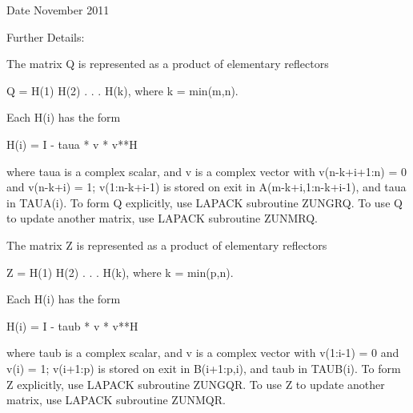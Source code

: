 \begin{DoxyDate}{Date}
November 2011 
\end{DoxyDate}
\begin{DoxyParagraph}{Further Details\+: }
\begin{DoxyVerb}  The matrix Q is represented as a product of elementary reflectors

     Q = H(1) H(2) . . . H(k), where k = min(m,n).

  Each H(i) has the form

     H(i) = I - taua * v * v**H

  where taua is a complex scalar, and v is a complex vector with
  v(n-k+i+1:n) = 0 and v(n-k+i) = 1; v(1:n-k+i-1) is stored on exit in
  A(m-k+i,1:n-k+i-1), and taua in TAUA(i).
  To form Q explicitly, use LAPACK subroutine ZUNGRQ.
  To use Q to update another matrix, use LAPACK subroutine ZUNMRQ.

  The matrix Z is represented as a product of elementary reflectors

     Z = H(1) H(2) . . . H(k), where k = min(p,n).

  Each H(i) has the form

     H(i) = I - taub * v * v**H

  where taub is a complex scalar, and v is a complex vector with
  v(1:i-1) = 0 and v(i) = 1; v(i+1:p) is stored on exit in B(i+1:p,i),
  and taub in TAUB(i).
  To form Z explicitly, use LAPACK subroutine ZUNGQR.
  To use Z to update another matrix, use LAPACK subroutine ZUNMQR.\end{DoxyVerb}
 
\end{DoxyParagraph}
